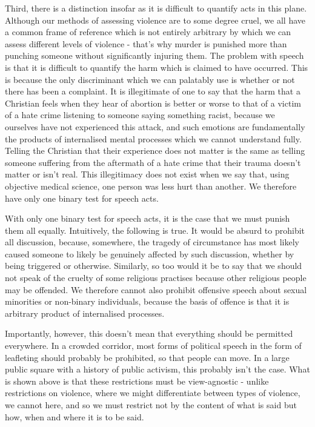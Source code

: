 \documentclass[10pt,a4paper,twoside]{article}
\begin{document}
\begin{multicols}{2}
Third, there is a distinction insofar as it is difficult to quantify
acts in this plane. Although our methods of assessing violence are to
some degree cruel, we all have a common frame of reference which is not
entirely arbitrary by which we can assess different levels of violence -
that's why murder is punished more than punching someone without
significantly injuring them. The problem with speech is that it is
difficult to quantify the harm which is claimed to have occurred. This
is because the only discriminant which we can palatably use is whether
or not there has been a complaint. It is illegitimate of one to say that
the harm that a Christian feels when they hear of abortion is better or
worse to that of a victim of a hate crime listening to someone saying
something racist, because we ourselves have not experienced this attack,
and such emotions are fundamentally the products of internalised mental
processes which we cannot understand fully. Telling the Christian that
their experience does not matter is the same as telling someone
suffering from the aftermath of a hate crime that their trauma doesn't
matter or isn't real. This illegitimacy does not exist when we say that,
using objective medical science, one person was less hurt than another.
We therefore have only one binary test for speech acts.

With only one binary test for speech acts, it is the case that we must
punish them all equally. Intuitively, the following is true. It would be
absurd to prohibit all discussion, because, somewhere, the tragedy of
circumstance has most likely caused someone to likely be genuinely
affected by such discussion, whether by being triggered or otherwise.
Similarly, so too would it be to say that we should not speak of the
cruelty of some religious practises because other religious people may
be offended. We therefore cannot also prohibit offensive speech about
sexual minorities or non-binary individuals, because the basis of
offence is that it is arbitrary product of internalised processes.

Importantly, however, this doesn't mean that everything should be
permitted everywhere. In a crowded corridor, most forms of political
speech in the form of leafleting should probably be prohibited, so that
people can move. In a large public square with a history of public
activism, this probably isn't the case. What is shown above is that
these restrictions must be view-agnostic - unlike restrictions on
violence, where we might differentiate between types of violence, we
cannot here, and so we must restrict not by the content of what is said
but how, when and where it is to be said.


\end{multicols}
\end{document}
